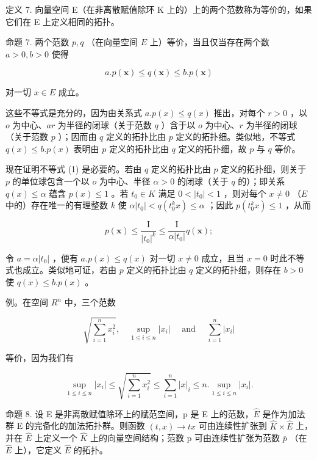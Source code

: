 定义 7. 向量空间 E（在非离散赋值除环 K 上的）上的两个范数称为等价的，如果它们在 E 上定义相同的拓扑。

命题 7. 两个范数 \(p, q\) （在向量空间 \(E\) 上）等价，当且仅当存在两个数 \(a > 0, b > 0\) 使得

\[
a. p (\pmb {x}) \leqslant q (\pmb {x}) \leqslant b. p (\pmb {x})\tag{I}
\]

对一切 \(x \in E\) 成立。

这些不等式是充分的，因为由关系式 \(a.p(x) \leqslant q(x)\) 推出，对每个 \(r > 0\) ，以 \(o\) 为中心、\(ar\) 为半径的闭球（关于范数 \(q\) ）含于以 \(o\) 为中心、\(r\) 为半径的闭球（关于范数 \(p\) ）；因而由 \(q\) 定义的拓扑比由 \(p\) 定义的拓扑细。类似地，不等式 \(q(x) \leqslant b.p(x)\) 表明由 \(p\) 定义的拓扑比由 \(q\) 定义的拓扑细，故 \(p\) 与 \(q\) 等价。

现在证明不等式 (1) 是必要的。若由 \(q\) 定义的拓扑比由 \(p\) 定义的拓扑细，则关于 \(p\) 的单位球包含一个以 \(o\) 为中心、半径 \(\alpha > 0\) 的闭球（关于 \(q\) 的）；即关系 \(q(x) \leqslant \alpha\) 蕴含 \(p(x) \leqslant 1\) 。若 \(t_0 \in K\) 满足 \(0 < |t_0| < 1\) ，则对每个 \(x \neq 0\) （\(E\) 中的）存在唯一的有理整数 \(k\) 使 \(\alpha |t_0| < q(t_0^k x) \leqslant \alpha\) ；因此 \(p(t_0^k x) \leqslant 1\) ，从而

\[
p (\boldsymbol {x}) \leqslant \frac {\mathrm{I}}{\left| t _ {0} \right| ^ {k}} \leqslant \frac {\mathrm{I}}{\alpha \left| t _ {0} \right|} q (\boldsymbol {x});
\]

令 \(a = \alpha |t_0|\) ，便有 \(a.p(x) \leqslant q(x)\) 对一切 \(x \neq 0\) 成立，且当 \(x = 0\) 时此不等式也成立。类似地可证，若由 \(p\) 定义的拓扑比由 \(q\) 定义的拓扑细，则存在 \(b > 0\) 使 \(q(x) \leqslant b.p(x)\) 。

例。在空间 \(R^{n}\) 中，三个范数

\[
\sqrt {\sum_ {i = 1} ^ {n} x _ {i} ^ {2}}, \quad \sup _ {1 \leqslant i \leqslant n} | x _ {i} | \quad \text { and } \quad \sum_ {i = 1} ^ {n} | x _ {i} |
\]

等价，因为我们有

\[
\sup _ {1 \leqslant i \leqslant n} | x _ {i} | \leqslant \sqrt {\sum_ {i = 1} ^ {n} x _ {i} ^ {2}} \leqslant \sum_ {i = 1} ^ {n} | x | _ {i} \leqslant n. \sup _ {1 \leqslant i \leqslant n} | x _ {i} |.\tag{2}
\]

命题 8. 设 E 是非离散赋值除环上的赋范空间，p 是 E 上的范数，\(\hat{E}\) 是作为加法群 E 的完备化的加法拓扑群。则函数 \((t, x) \to tx\) 可由连续性扩张到 \(\hat{K} \times \hat{E}\) 上，并在 \(\hat{E}\) 上定义一个 \(\hat{K}\) 上的向量空间结构；范数 p 可由连续性扩张为范数 \(\overline{p}\) （在 \(\hat{E}\) 上），它定义 \(\hat{E}\) 的拓扑。

